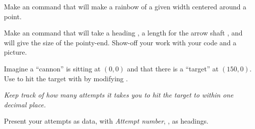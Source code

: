 \documentclass[noauthor,nooutcomes,12pt]{ximera}
\begin{document}
\mynewpage


\begin{problem}
  Make an  command that will make a rainbow of a given
  width centered around a point.
\end{problem}

\mynewpage

\begin{problem}
  Make an  command that will take a heading
  , a length for the arrow shaft , and  will give
  the size of the pointy-end.  Show-off your work with your code and a
  picture.
\end{problem}

\mynewpage

\begin{problem}
  Imagine a ``cannon'' is sitting at $(0,0)$ and that there is a
  ``target'' at $(150,0)$. Use  to hit the target with
   by modifying .

  \emph{Keep track of how many attempts it takes you to hit the target
    to within one decimal place.}

  Present your attempts as data, with \emph{Attempt number}, ,
   as headings.
\end{problem}
\end{document}
